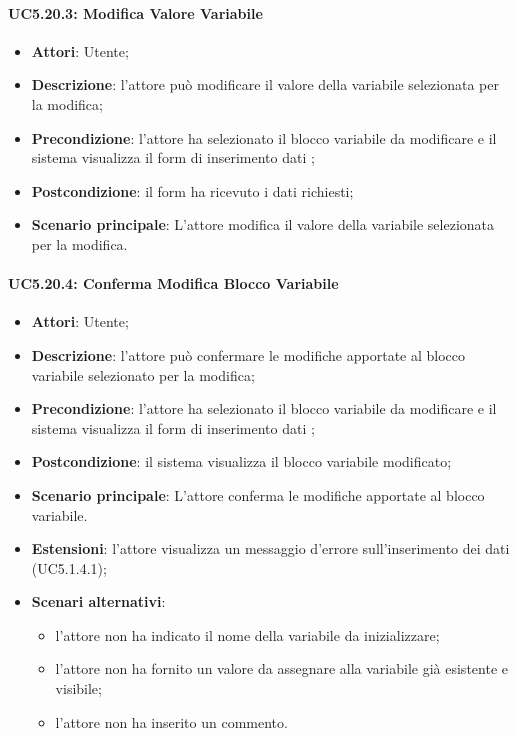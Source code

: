 	\paragraph{UC5.20.3: Modifica Valore Variabile}
	\label{UC5.20.3}
	\begin{itemize}
		\item \textbf{Attori}: Utente;
		\item \textbf{Descrizione}: l'attore può modificare il valore della variabile selezionata per la modifica;
		\item \textbf{Precondizione}: l'attore ha selezionato il blocco variabile da modificare e il sistema visualizza il form di inserimento dati ;
		\item \textbf{Postcondizione}: il form ha ricevuto i dati richiesti;
		\item \textbf{Scenario principale}: L'attore modifica il valore della variabile selezionata per la modifica.
\end{itemize}

\paragraph{UC5.20.4: Conferma Modifica Blocco Variabile}
\label{UC5.20.4}
\begin{itemize}
	\item \textbf{Attori}: Utente;
	\item \textbf{Descrizione}: l'attore può confermare le modifiche apportate al blocco variabile selezionato per la modifica;
	\item \textbf{Precondizione}: l'attore ha selezionato il blocco variabile da modificare e il sistema visualizza il form di inserimento dati ;
	\item \textbf{Postcondizione}: il sistema visualizza il blocco variabile modificato;
	\item \textbf{Scenario principale}: L'attore conferma le modifiche apportate al blocco variabile.
	\item \textbf{Estensioni}: l'attore visualizza un messaggio d'errore sull'inserimento dei dati (UC5.1.4.1);
	\item \textbf{Scenari alternativi}:
	\begin{itemize}
		\item l'attore non ha indicato il nome della variabile da inizializzare;
		\item l'attore non ha fornito un valore da assegnare alla variabile già esistente e visibile;
		\item l'attore non ha inserito un commento.
	\end{itemize}
\end{itemize}

